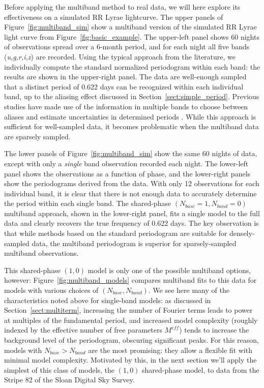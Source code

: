 \documentclass{emulateapj}
\newcommand{\Fig}[1]{Figure~\ref{fig:#1}}
\newcommand{\fig}[1]{\Fig{#1}}
\newcommand{\Sect}[1]{Section~\ref{sect:#1}}
\newcommand{\sect}[1]{\Sect{#1}}
\newcommand{\new}[1]{{\color{red} #1}}
\begin{document}
Before applying the multiband method to real data, we will here explore its effectiveness on a simulated RR Lyrae lightcurve.
The upper panels of \fig{multiband_sim} show a multiband version of the simulated RR Lyrae light curve from \fig{basic_example}.
The upper-left panel shows 60 nights of observations spread over a 6-month period, and for each night all five bands ({\it u,g,r,i,z}) are recorded.
Using the typical approach from the literature, we individually compute the standard normalized periodogram within each band: the results are shown in the upper-right panel.
The data are well-enough sampled that a distinct period of 0.622 days can be recognized within each individual band, up to the aliasing effect discussed in \sect{simple_period}.
Previous studies have made use of the information in multiple bands to choose between aliases and estimate uncertainties in determined periods \citep[e.g.][]{Sesar2010,Oluseyi12}.
While this approach is sufficient for well-sampled data, it becomes problematic when the multiband data are sparsely sampled.

The lower panels of \fig{multiband_sim} show the same 60 nights of data, except with only a {\it single} band observation recorded each night.
The lower-left panel shows the observations as a function of phase, and the lower-right panels show the periodograms derived from the data.
With only 12 observations for each individual band, it is clear that there is not enough data to accurately determine the period within each single band. The shared-phase $(N_{base}=1,N_{band}=0)$ multiband approach, shown in the lower-right panel, fits a single model to the full data and clearly recovers the true frequency of 0.622 days. \new{The key observation is that while methods based on the standard periodogram are suitable for densely-sampled data, the multiband periodogram is superior for sparsely-sampled multiband observations.}

This shared-phase $(1,0)$ model is only one of the possible multiband options, however: \fig{multiband_models} compares multiband fits to this data for models with various choices of $(N_{base},N_{band})$.
We see here many of the characteristics noted above for single-band models: as discussed in \sect{multiterm}, increasing the number of Fourier terms leads to power at multiples of the fundamental period, and increased model complexity (roughly indexed by the effective number of free parameters $M^{eff}$) tends to increase the background level of the periodogram, obscuring significant peaks.
For this reason, models with $N_{base} > N_{band}$ are the most promising: they allow a flexible fit with minimal model complexity. Motivated by this, in the next section we'll apply the simplest of this class of models, the $(1, 0)$ shared-phase model, to data from the Stripe 82 of the Sloan Digital Sky Survey.
\end{document}
